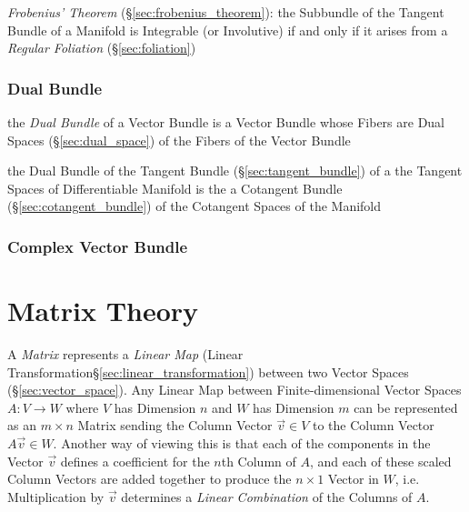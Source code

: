
\emph{Frobenius' Theorem} (\S\ref{sec:frobenius_theorem}): the Subbundle of the
Tangent Bundle of a Manifold is Integrable (or Involutive) if and only if it
arises from a \emph{Regular Foliation} (\S\ref{sec:foliation})



\subsubsection{Dual Bundle}\label{sec:dual_vectorbundle}

the \emph{Dual Bundle} of a Vector Bundle is a Vector Bundle whose Fibers are
Dual Spaces (\S\ref{sec:dual_space}) of the Fibers of the Vector Bundle

the Dual Bundle of the Tangent Bundle (\S\ref{sec:tangent_bundle}) of a the
Tangent Spaces of Differentiable Manifold is the a Cotangent Bundle
(\S\ref{sec:cotangent_bundle}) of the Cotangent Spaces of the Manifold



\subsubsection{Complex Vector Bundle}\label{sec:complex_vector_bundle}



\section{Matrix Theory}\label{sec:matrix_theory}


A \emph{Matrix} represents a \emph{Linear Map} (Linear
Transformation\S\ref{sec:linear_transformation}) between two Vector Spaces
(\S\ref{sec:vector_space}). Any Linear Map between Finite-dimensional Vector
Spaces $A : V \rightarrow W$ where $V$ has Dimension $n$ and $W$ has Dimension
$m$ can be represented as an $m \times n$ Matrix sending the Column Vector
$\vec{v} \in V$ to the Column Vector $A\vec{v} \in W$. Another way of viewing
this is that each of the components in the Vector $\vec{v}$ defines a
coefficient for the $n$th Column of $A$, and each of these scaled Column
Vectors are added together to produce the $n \times 1$ Vector in $W$, i.e.
Multiplication by $\vec{v}$ determines a \emph{Linear Combination} of the
Columns of $A$.

